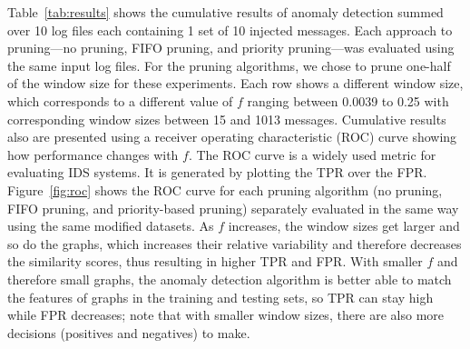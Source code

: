 Table~\ref{tab:results} shows the cumulative results of anomaly detection summed over 10 log files each containing 1 set of 10 injected messages. Each approach to pruning---no pruning, FIFO pruning, and priority pruning---was evaluated using the same input log files.  For the pruning algorithms, we chose to prune one-half of the window size for these experiments. Each row shows a different window size, which corresponds to a different value of $f$ ranging between 0.0039 to 0.25 with corresponding window sizes between 15 and 1013 messages. Cumulative results also are presented using a receiver operating characteristic (ROC) curve showing how performance changes with $f$. The ROC curve is a widely used metric for evaluating IDS systems. It is generated by plotting the TPR over the FPR. Figure~\ref{fig:roc} shows the ROC curve for each pruning algorithm (no pruning, FIFO pruning, and priority-based pruning) separately evaluated in the same way using the same modified datasets. As $f$ increases, the window sizes get larger and so do the graphs, which increases their relative variability and therefore decreases the similarity scores, thus resulting in higher TPR and FPR. With smaller $f$ and therefore small graphs, the anomaly detection algorithm is better able to match the features of graphs in the training and testing sets, so TPR can stay high while FPR decreases; note that with smaller window sizes, there are also more decisions (positives and negatives) to make. 

